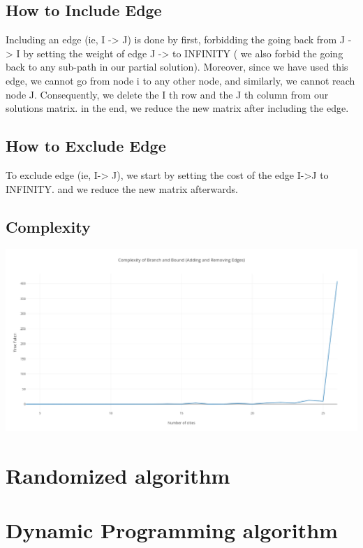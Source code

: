\documentclass[11pt, english]{article}
\begin{document}
\subsection{How to Include Edge}
Including an edge (ie, I -> J) is done by first, forbidding the going back from J -> I by setting the weight of edge J -> to INFINITY ( we also forbid the going back to any sub-path in our partial solution). Moreover, since we have used this edge, we cannot go from node i to any other node, and similarly, we cannot reach node J. Consequently, we delete the I th row and the J th column from our solutions matrix.
in the end, we reduce the new matrix after including the edge.

\subsection{How to Exclude Edge}
To exclude edge (ie, I-> J), we start by setting the cost of the edge I->J to INFINITY. and we reduce the new matrix afterwards.

\subsection{Complexity}

\begin{center}
\includegraphics[scale=0.22]{branchandbound.png}
\end{center}
\newpage


\section{Randomized algorithm}	
	
 \section{Dynamic Programming algorithm}	
	
\end{document}
